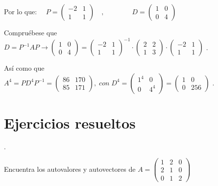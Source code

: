 \begin{ejem}
Por lo que: $\quad P=\left( \begin{matrix} -2&1\\1&1 \end{matrix} \right) \quad , \qquad \qquad 
D=\left( \begin{matrix} 1&0\\0&4 \end{matrix} \right) $

\noindent \footnotesize{\textcolor{gris}{Compruébese que $D=P^{-1}AP \to  \left( \begin{matrix} 1&0\\0&4 \end{matrix} \right)=\left( \begin{matrix} -2&1\\1&1 \end{matrix} \right)^{-1} \cdot 
\left( \begin{matrix} 2&2\\1&3 \end{matrix} \right) \cdot 
\left( \begin{matrix} -2&1\\1&1 \end{matrix} \right)$ }}\normalsize{.}

\noindent \footnotesize{\textcolor{gris}{Así como que $A^4=PD^4P^{-1}=\left( \begin{matrix} 86&170\\85&171 \end{matrix} \right), \; con \; D^4=\left( \begin{matrix} 1^4&0\\0&4^4 \end{matrix} \right)=\left( \begin{matrix} 1&0\\0&256 \end{matrix} \right)$  }}\normalsize{.}


\end{ejem}







\section{Ejercicios resueltos}

\begin{ejre}.

Encuentra los autovalores y autovectores de $A=\left( \begin{matrix} 1&2&0\\2&1&0\\0&1&2 \end{matrix} \right)$	
\end{ejre}

